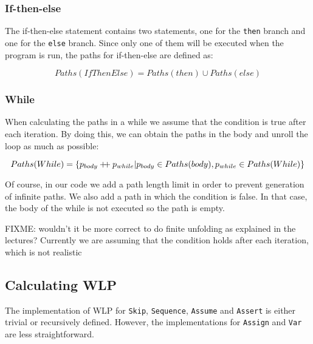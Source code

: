 \documentclass[a4paper]{article}
\newcommand\mdoubleplus{\ensuremath{\mathbin{+\mkern-5mu+}}}
\begin{document}
\subsubsection*{If-then-else}

The if-then-else statement contains two statements, one for the \texttt{then} branch
and one for the \texttt{else} branch. Since only one of them will be executed
when the program is run, the paths for if-then-else are defined as:

\[ Paths(IfThenElse) = Paths(then) \cup Paths(else) \]

%

\subsubsection*{While}

When calculating the paths in a while we assume that the condition is true
after each iteration. By doing this, we can obtain the paths in the body and
unroll the loop as much as possible:

\[ Paths(While) = \{ p_{body} \mdoubleplus p_{while} | p_{body} \in Paths(body), p_{while} \in Paths(While)\} \]

Of course, in our code we add a path length limit in order to prevent generation
of infinite paths. We also add a path in which the condition is false. In that
case, the body of the while is not executed so the path is empty.

FIXME: wouldn't it be more correct to do finite unfolding as explained in the lectures?
Currently we are assuming that the condition holds after each iteration, which is not realistic

\subsection{Calculating WLP}

The implementation of WLP for \texttt{Skip}, \texttt{Sequence}, \texttt{Assume}
and \texttt{Assert} is either trivial or recursively defined. However, the
implementations for \texttt{Assign} and \texttt{Var} are less straightforward.
\end{document}
